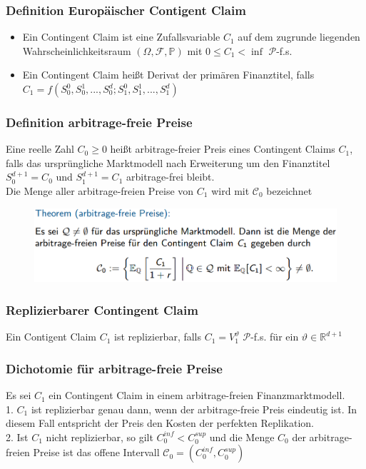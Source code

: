 \documentclass[12pt]{report}
\theoremstyle{dotless}
\theoremstyle{definition}
\begin{document}
\subsubsection{Definition Europäischer Contigent Claim}
\begin{itemize}
\item Ein Contingent Claim ist eine Zufallsvariable $C_1$ auf dem zugrunde liegenden
Wahrscheinlichkeitsraum $(\Omega, \mathcal{F}, \mathbb{P})$ mit $0\leq C_1 < \inf$ $\mathcal{P}$-f.s.
\item Ein Contingent Claim heißt Derivat der primären Finanztitel, falls \\
$C_1 = f(S_0^0, S_0^1, ..., S_0^d; S_1^0, S_1^1,..., S_1^d)$
 \end{itemize}


\subsubsection{Definition arbitrage-freie Preise}
Eine reelle Zahl $C_0 \geq 0$ heißt arbitrage-freier Preis eines Contingent Claims
$C_1$, falls das ursprüngliche Marktmodell nach Erweiterung um den Finanztitel $S_0^{d+1}=C_0$ und $S_1^{d+1}=C_1$ arbitrage-frei bleibt. \\
Die Menge aller arbitrage-freien Preise von $C_1$ wird mit $\mathcal{C}_0$ bezeichnet


\begin{figure}[ht]
	\centering
	\includegraphics[width=\textwidth]{Bilder/Arbitragefrei.png}
\end{figure}


\subsubsection{Replizierbarer Contingent Claim}
Ein Contigent Claim $C_1$ ist replizierbar, falls $C_1 = V_1^\vartheta$ $\mathcal{P}$-f.s. für ein $\vartheta \in \mathbb{R}^{d+1}$

\subsubsection{Dichotomie für arbitrage-freie Preise} 
Es sei $C_1$ ein Contingent Claim in einem arbitrage-freien Finanzmarktmodell. \\
1. $C_1$ ist replizierbar genau dann, wenn der arbitrage-freie Preis eindeutig ist. In diesem Fall entspricht der Preis den Kosten der perfekten Replikation. \\
2. Ist $C_1$ nicht replizierbar, so gilt $C_0^{inf} < C_0^{sup}$ und die Menge $C_0$ der arbitrage-freien Preise ist das offene Intervall $\mathcal{C}_0=(C_0^{inf}, C_0^{sup})$
\end{document}
